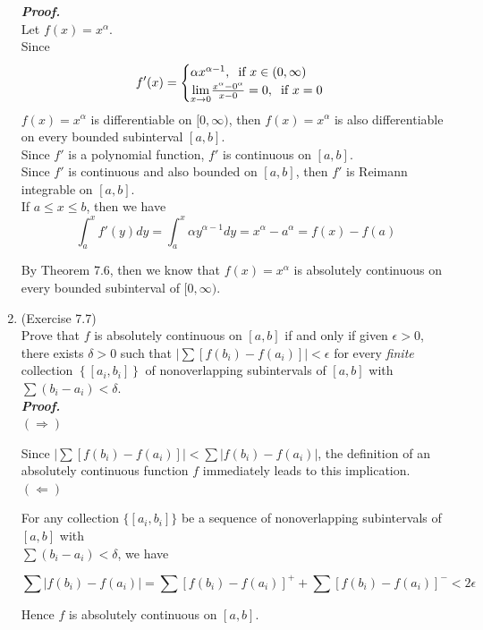 \documentclass[a4paper,11pt]{article}
\begin{document}
\begin{enumerate}
 		\textit{\textbf {Proof.}}\\
 		Let $f(x) = x^\alpha$.\\
 		Since
 		$$f'(x) =
 		\begin{cases}
 		\alpha x^{\alpha - 1}, \hspace{0.2cm} \mbox{if } x \in (0,\infty)\\
 		\underset{x \to 0}{\lim} \frac{x^\alpha - 0^\alpha}{x - 0} = 0, \hspace{0.2cm} \mbox{if } x = 0
 		\end{cases}$$
 		$f(x) = x^\alpha$ is differentiable on $[0,\infty)$, then $f(x) = x^\alpha$ is also differentiable on every bounded subinterval $[a,b]$.\\

 		Since $f'$ is a polynomial function, $f'$ is continuous on $[a,b]$.\\
 		Since $f'$ is continuous and also bounded on $[a,b]$, then $f'$ is Reimann integrable on $[a,b]$.\\

 		If $a \leq x \leq b$, then we have
 		$$\int_a^x f'(y) dy
 		= \int_a^x \alpha y^{\alpha - 1} dy
 		= x^\alpha - a^\alpha = f(x) - f(a)$$

 		By Theorem 7.6, then we know that $f(x) = x^\alpha$ is absolutely continuous on every bounded subinterval of $[0,\infty)$.\\






 	\item (Exercise 7.7)\\
 		Prove that $f$ is absolutely continuous on $[a, b]$ if and only if given $\epsilon > 0$, there exists $\delta > 0$ such that $\left| \sum \left[ f(b_i) - f(a_i) \right] \right| < \epsilon$ for every \textit{finite} collection $\left\{ [a_i, b_i] \right\}$ of nonoverlapping subintervals of $[a,b]$ with $\sum (b_i - a_i) < \delta$.\\

 		\textit{\textbf {Proof.}}\\

 		$(\Rightarrow)$\

 		Since $\left| \sum \left[ f(b_i) - f(a_i) \right] \right| < \sum \left| f(b_i) - f(a_i) \right|$, the definition of an absolutely continuous function $f$ immediately leads to this implication.\\

 		$(\Leftarrow)$\

 		For any collection $\{ [a_i, b_i] \}$ be a sequence of nonoverlapping subintervals of $[a,b]$ with\\ $\sum (b_i - a_i) < \delta$, we have

 		$$\sum |f(b_i) - f(a_i)|
 		= \sum [f(b_i) - f(a_i)]^+ + \sum \left[ f(b_i) - f(a_i) \right]^-
 		< 2\epsilon$$

 		Hence $f$ is absolutely continuous on $[a, b]$.



 \end{enumerate}
\end{document}
